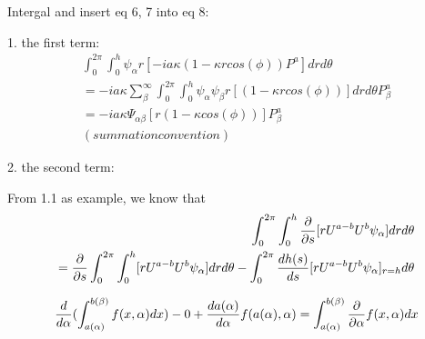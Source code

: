 \documentclass{Note}
\begin{document}
Intergal and insert eq 6, 7 into eq 8:

1. the first term:
\begin{equation}
\begin{aligned}
\int_0^{2\pi}\int_0^h \psi_\alpha r [-ia\kappa (1-\kappa r cos(\phi))P^a] dr d\theta\\
=-ia\kappa \sum_{\beta}^\infty \int_0^{2\pi}\int_0^h \psi_\alpha\psi_\beta r [(1-\kappa r cos(\phi))] dr d\theta P_\beta^a\\
=-ia \kappa \Psi_{\alpha\beta}[r(1-\kappa cos(\phi))] P_\beta^a \\
(summation convention)
\end{aligned}
\end{equation}

2. the second term:

From 1.1 as example, we know that
\begin{equation}
\begin{aligned}
\int_0^{2\pi}\int_0^h   {{\partial }\over {\partial s}}[ {r U^{a-b}} U^b\psi_\alpha] dr d\theta \\
={{\partial }\over {\partial s}}\int_0^{2\pi}\int_0^h   [ {r U^{a-b}} U^b\psi_\alpha] dr d\theta 
-\int_0^{2\pi}{dh(s)\over ds}[ {r U^{a-b}} U^b\psi_\alpha]_{r=h}d\theta\\
\end{aligned}
\end{equation}

\begin{equation}
\begin{aligned}
{d\over d\alpha}(\int_{a(\alpha)}^{b(\beta)}f(x,\alpha)dx)-0+{da(\alpha)\over d\alpha}f(a(\alpha),\alpha)=\int_{a(\alpha)}^{b(\beta)}{\partial \over \partial \alpha}f(x,\alpha)dx
\end{aligned}
\end{equation}
\end{document}
